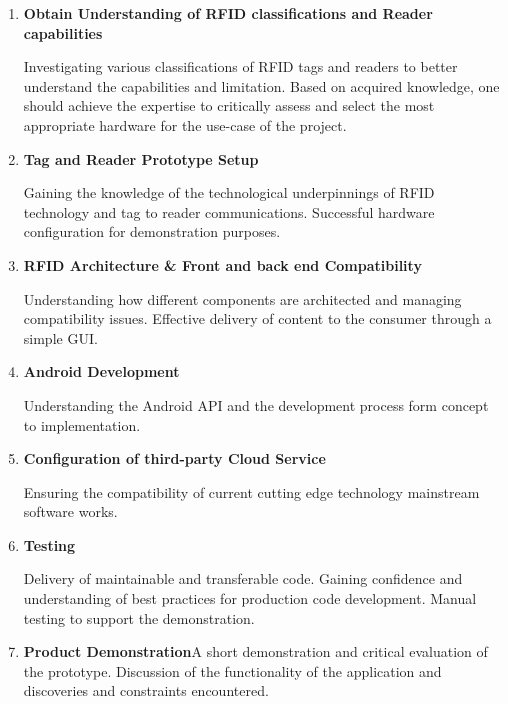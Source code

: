\documentclass[a4paper, 11pt]{article}
\begin{document}
\begin{enumerate}
   \item \textbf{Obtain Understanding of  RFID classifications and Reader capabilities}
   	\begin{flushleft}Investigating various classifications of RFID tags and readers to better understand the capabilities and limitation. Based on acquired knowledge, one should achieve the expertise to critically assess and select the most appropriate hardware for the use-case of the project.
	\end{flushleft}
   \item \textbf{Tag and Reader Prototype Setup}
   \begin{flushleft}
  Gaining the knowledge of the technological underpinnings of RFID technology and tag to reader communications. Successful hardware configuration for demonstration purposes. 
  \end{flushleft}
   \item \textbf{RFID Architecture \&  Front and back end Compatibility}
   \begin{flushleft}Understanding how different components are architected and managing compatibility issues. Effective delivery of content to the consumer through a simple GUI.
  \end{flushleft}
   \item \textbf{Android Development}
   \begin{flushleft}Understanding the Android API and the development process form concept to implementation. 
  \end{flushleft}
   \item \textbf{Configuration of third-party Cloud Service}
   \begin{flushleft} Ensuring the compatibility of 
current cutting edge technology mainstream software works.
 \end{flushleft}
  \item \textbf{Testing}
   \begin{flushleft}Delivery of maintainable and transferable code. Gaining confidence and understanding of best practices for production code development. Manual testing to support the demonstration. 

 \end{flushleft}
 \item \textbf{Product Demonstration}A short demonstration and critical evaluation of the prototype. Discussion of the functionality of the application and discoveries and constraints encountered.

   \begin{flushleft} 
   
 \end{flushleft}

\end{enumerate}
\end{document}
